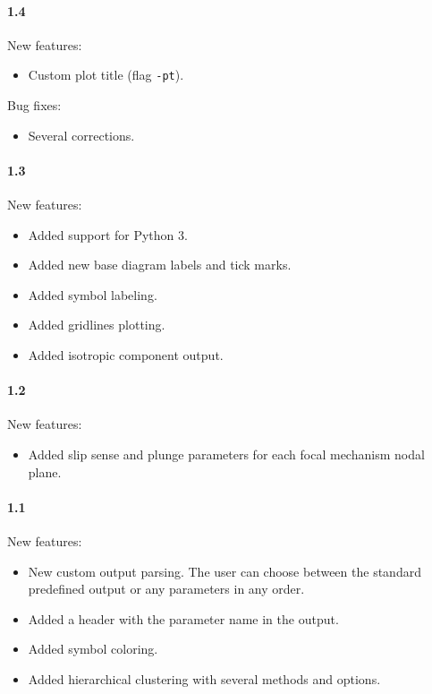 \documentclass[11pt,a4paper,english]{article}
\numberwithin{equation}{section}
\begin{document}
\paragraph{1.4}

New features:
\begin{itemize}
\item Custom plot title (flag \texttt{-pt}).
\end{itemize}
Bug fixes:
\begin{itemize}
\item Several corrections.
\end{itemize}

\paragraph{1.3}

New features:
\begin{itemize}
\item Added support for Python 3.
\item Added new base diagram labels and tick marks.
\item Added symbol labeling.
\item Added gridlines plotting.
\item Added isotropic component output.
\end{itemize}

\paragraph{1.2}

New features:
\begin{itemize}
\item Added slip sense and plunge parameters for each focal mechanism nodal
plane.
\end{itemize}

\paragraph{1.1}

New features:
\begin{itemize}
\item New custom output parsing. The user can choose between the standard
predefined output or any parameters in any order.
\item Added a header with the parameter name in the output.
\item Added symbol coloring.
\item Added hierarchical clustering with several methods and options.
\end{itemize}
\end{document}
